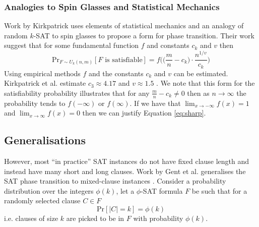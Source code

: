\subsubsection{Analogies to Spin Glasses and Statistical Mechanics}
Work by Kirkpatrick uses elements of statistical mechanics and an analogy of
random $k$-SAT to spin glasses to propose a form for phase transition.
Their work suggest that for some fundamental function $f$ and constants $c_k$
and $v$ then
\begin{equation}
    \mathrm{Pr}_{F \sim U_k(n, m)}[F \text{ is satisfiable}] = f\Big(\Big(\frac{m}{n} - c_k\Big) \cdot \frac{n^{1/v}}{c_k}\Big) %
\end{equation}
Using empirical methods $f$ and the constants $c_k$ and $v$ can be estimated.
Kirkpatrick et al. estimate $c_3 \approx 4.17$ and $v \approx 1.5$ \cite{kirkpatrick1994statistical}.
We note that this form for the satisfiability probability illustrates that
for any $\frac{m}{n} - c_k \neq 0$ then as $n \to \infty$ the probability tends
to $f(-\infty)$ or $f(\infty)$. If we
have that $\lim_{x \to -\infty}f(x) = 1$ and $\lim_{x \to \infty}f(x) = 0$ then we
can justify Equation \ref{eq:sharp}.


\subsection{Generalisations}
However, most ``in practice'' SAT instances do not have fixed clause length
and instead have many short and long clauses. Work by Gent et al. generalises
the SAT phase transition to mixed-clause instances \cite{phase_transition}.
Consider a probability distribution over the integers $\phi(k)$, let a $\phi$-SAT
formula $F$ be such that for a randomly selected clause $C \in F$
\begin{equation}
    \mathrm{Pr}[|C| = k] = \phi(k)
\end{equation}
i.e. clauses of size $k$ are picked to be in $F$ with probability $\phi(k)$.

